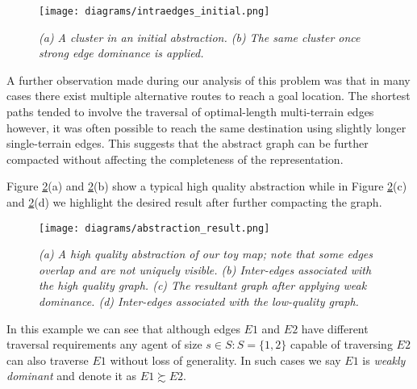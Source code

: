\begin{figure}[htbp]
	\vspace{-9pt}
        \caption{\emph{(a) A cluster in an initial abstraction. (b) The same cluster once strong edge dominance is applied.} \vspace{0.5em} }
        \begin{center}
                        \texttt{[image: diagrams/intraedges\_initial.png]}
        \end{center}
        \label{aha-fig:strongdominance}
	\vspace{-9pt}
\end{figure}
A further observation made during our analysis of this problem was that in many cases there exist multiple alternative routes to reach a goal location.
The shortest paths tended to involve the traversal of optimal-length multi-terrain edges however, it was often possible to reach the same destination using slightly longer single-terrain edges.
This suggests that the abstract graph can be further compacted without affecting the completeness of the representation.
\par \indent
Figure \ref{aha-fig:abstractgraph}(a) and \ref{aha-fig:abstractgraph}(b) show a typical high quality abstraction while in Figure \ref{aha-fig:abstractgraph}(c) and \ref{aha-fig:abstractgraph}(d) we highlight the desired result after further compacting the graph.
\begin{figure}[htbp]
	\vspace{-9pt}
        \caption{\emph{(a) A high quality abstraction of our toy map; note that some edges overlap and are not uniquely visible. (b) Inter-edges associated with the high quality graph. (c) The resultant graph after applying weak dominance. (d) Inter-edges associated with the low-quality graph.}  \vspace{0.5em} }
        \begin{center}
                        \texttt{[image: diagrams/abstraction\_result.png]}
        \end{center}
        \label{aha-fig:abstractgraph}
	\vspace{-10pt}
\end{figure}
In this example we can see that although edges $E1$ and $E2$ have different traversal requirements any agent of size $s \in S : S = \lbrace 1, 2 \rbrace$ capable of traversing $E2$ can also traverse $E1$ without loss of generality. 
In such cases we say $E1$ is \emph{weakly dominant} and denote it as $E1 \succsim E2$. 
